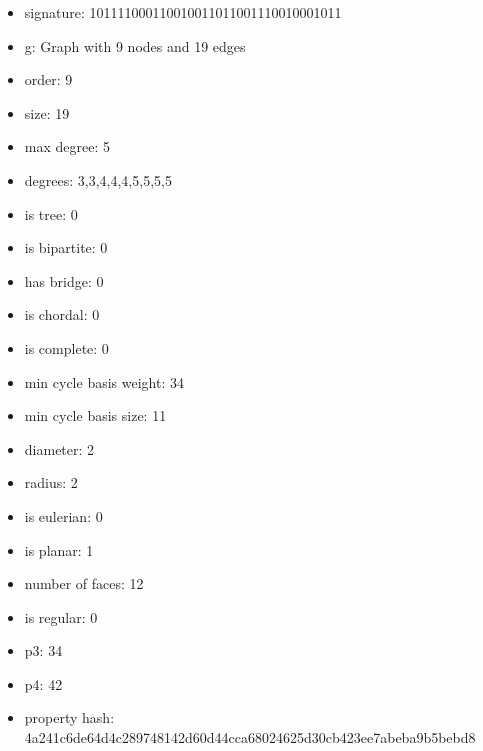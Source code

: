 \newpage
\begin{figure}
\end{figure}
\begin{itemize}
\item signature: 101111000110010011011001110010001011
\item g: Graph with 9 nodes and 19 edges
\item order: 9
\item size: 19
\item max degree: 5
\item degrees: 3,3,4,4,4,5,5,5,5
\item is tree: 0
\item is bipartite: 0
\item has bridge: 0
\item is chordal: 0
\item is complete: 0
\item min cycle basis weight: 34
\item min cycle basis size: 11
\item diameter: 2
\item radius: 2
\item is eulerian: 0
\item is planar: 1
\item number of faces: 12
\item is regular: 0
\item p3: 34
\item p4: 42
\item property hash: 4a241c6de64d4c289748142d60d44cca68024625d30cb423ee7abeba9b5bebd8
\end{itemize}
